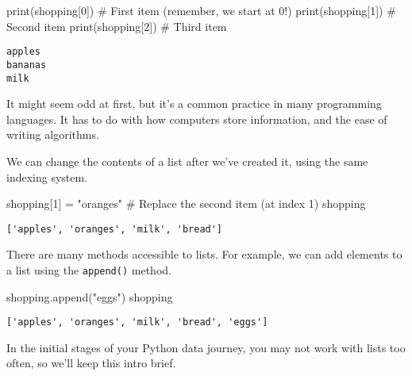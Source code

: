 \documentclass[
  letterpaper,
  DIV=11,
  numbers=noendperiod]{scrreprt}
\newenvironment{Shaded}{\begin{snugshade}}{\end{snugshade}}
\newcommand{\BuiltInTok}[1]{\textcolor[rgb]{0.00,0.23,0.31}{#1}}
\newcommand{\CommentTok}[1]{\textcolor[rgb]{0.37,0.37,0.37}{#1}}
\newcommand{\DecValTok}[1]{\textcolor[rgb]{0.68,0.00,0.00}{#1}}
\newcommand{\NormalTok}[1]{\textcolor[rgb]{0.00,0.23,0.31}{#1}}
\newcommand{\OperatorTok}[1]{\textcolor[rgb]{0.37,0.37,0.37}{#1}}
\newcommand{\StringTok}[1]{\textcolor[rgb]{0.13,0.47,0.30}{#1}}
\begin{document}
\begin{Shaded}
\begin{Highlighting}[]
\BuiltInTok{print}\NormalTok{(shopping[}\DecValTok{0}\NormalTok{])  }\CommentTok{\# First item (remember, we start at 0!)}
\BuiltInTok{print}\NormalTok{(shopping[}\DecValTok{1}\NormalTok{])  }\CommentTok{\# Second item}
\BuiltInTok{print}\NormalTok{(shopping[}\DecValTok{2}\NormalTok{])  }\CommentTok{\# Third item}
\end{Highlighting}
\end{Shaded}

\begin{verbatim}
apples
bananas
milk
\end{verbatim}

It might seem odd at first, but it's a common practice in many
programming languages. It has to do with how computers store
information, and the ease of writing algorithms.

We can change the contents of a list after we've created it, using the
same indexing system.

\begin{Shaded}
\begin{Highlighting}[]
\NormalTok{shopping[}\DecValTok{1}\NormalTok{] }\OperatorTok{=} \StringTok{"oranges"}  \CommentTok{\# Replace the second item (at index 1)}
\NormalTok{shopping}
\end{Highlighting}
\end{Shaded}

\begin{verbatim}
['apples', 'oranges', 'milk', 'bread']
\end{verbatim}

There are many methods accessible to lists. For example, we can add
elements to a list using the \texttt{append()} method.

\begin{Shaded}
\begin{Highlighting}[]
\NormalTok{shopping.append(}\StringTok{"eggs"}\NormalTok{)}
\NormalTok{shopping}
\end{Highlighting}
\end{Shaded}

\begin{verbatim}
['apples', 'oranges', 'milk', 'bread', 'eggs']
\end{verbatim}

In the initial stages of your Python data journey, you may not work with
lists too often, so we'll keep this intro brief.
\end{document}
